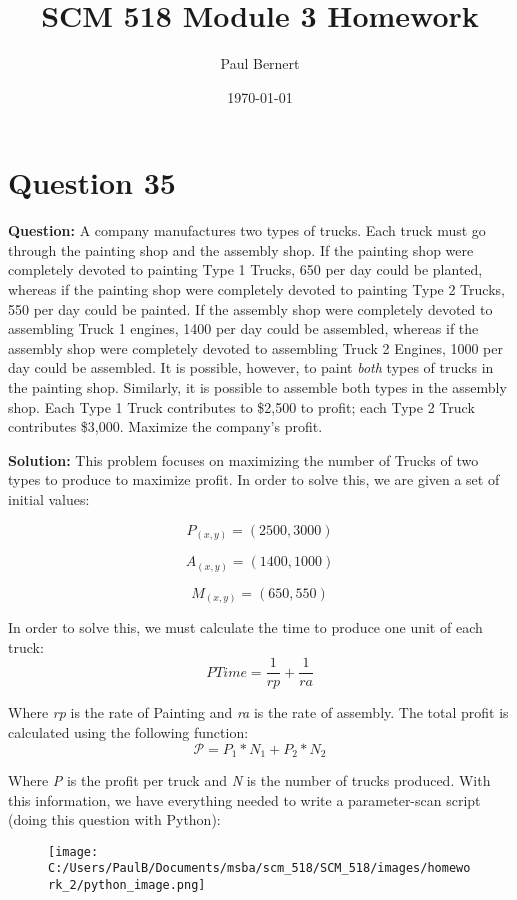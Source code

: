 \documentclass[notitlepage]{report}
\title{SCM 518 Module 3 Homework}
\author{Paul Bernert}
\date{\today}
\begin{document}
\maketitle
\thispagestyle{empty}

\section*{Question 35}
\textbf{Question:} A company manufactures two types of trucks. Each truck must go through the painting shop and the assembly shop. If the painting shop were completely devoted to painting Type 1 Trucks, 650 per day could be planted, whereas if the painting shop were completely devoted to painting Type 2 Trucks, 550 per day could be painted. If the assembly shop were completely devoted to assembling Truck 1 engines, 1400 per day could be assembled, whereas if the assembly shop were completely devoted to assembling Truck 2 Engines, 1000 per day could be assembled. It is possible, however, to paint \textit{both} types of trucks in the painting shop. Similarly, it is possible to assemble both types in the assembly shop. Each Type 1 Truck contributes to \$2,500 to profit; each Type 2 Truck contributes \$3,000. Maximize the company's profit.

\textbf{Solution:}
This problem focuses on maximizing the number of Trucks of two types to produce to maximize profit. In order to solve this, we are given a set of initial values:

$$
P_{(x,y)} = (2500, 3000)
$$

$$
A_{(x,y)} = (1400, 1000)
$$

$$
M_{(x,y)} = (650, 550)
$$

In order to solve this, we must calculate the time to produce one unit of each truck:
$$
PTime = \frac{1}{rp} + \frac{1}{ra}
$$

Where \textit{rp} is the rate of Painting and \textit{ra} is the rate of assembly. The total profit is calculated using the following function:
$$
\mathcal{P} = P_{1}*N_{1} + P_{2}*N_{2}
$$

Where \textit{P} is the profit per truck and \textit{N} is the number of trucks produced. With this information, we have everything needed to write a parameter-scan script (doing this question with Python):

\begin{figure}[H]
	\centering
	\texttt{[image: C:/Users/PaulB/Documents/msba/scm\_518/SCM\_518/images/homework\_2/python\_image.png]}
\end{figure}
\end{document}
